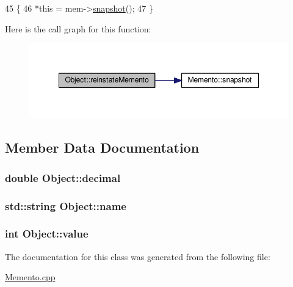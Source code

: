 \begin{DoxyCode}
45                                            \{
46     *\textcolor{keyword}{this} = mem->\hyperlink{classMemento_a13c0885085d6010835ebcfde5808f4af}{snapshot}();
47 \}
\end{DoxyCode}


Here is the call graph for this function\+:
\nopagebreak
\begin{figure}[H]
\begin{center}
\leavevmode
\includegraphics[width=348pt]{classObject_a19d41bf5b99d4a5880aaab5640d8787a_cgraph}
\end{center}
\end{figure}




\subsection{Member Data Documentation}
\subsubsection[{\texorpdfstring{decimal}{decimal}}]{\setlength{\rightskip}{0pt plus 5cm}double Object\+::decimal\hspace{0.3cm}{\ttfamily [private]}}\hypertarget{classObject_abee4fc3561439ea77b960f839f5c8616}{}\label{classObject_abee4fc3561439ea77b960f839f5c8616}
\subsubsection[{\texorpdfstring{name}{name}}]{\setlength{\rightskip}{0pt plus 5cm}std\+::string Object\+::name\hspace{0.3cm}{\ttfamily [private]}}\hypertarget{classObject_a24457e0a387492c80594aec7681a2277}{}\label{classObject_a24457e0a387492c80594aec7681a2277}
\subsubsection[{\texorpdfstring{value}{value}}]{\setlength{\rightskip}{0pt plus 5cm}int Object\+::value\hspace{0.3cm}{\ttfamily [private]}}\hypertarget{classObject_aff40b305580fdacdf3e2c63dfc181152}{}\label{classObject_aff40b305580fdacdf3e2c63dfc181152}


The documentation for this class was generated from the following file\+:\begin{DoxyCompactItemize}
\item 
\hyperlink{Memento_8cpp}{Memento.\+cpp}\end{DoxyCompactItemize}
